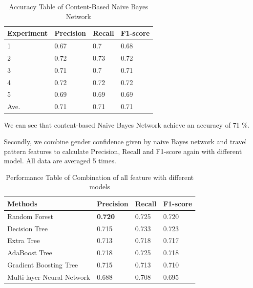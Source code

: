 \documentclass{article}
\begin{document}
\begin{table}[tp]
\centering
\caption{Accuracy Table of Content-Based Naive Bayes Network}
\label{tab1}
\begin{center}
\begin{small}
\begin{sc}
\begin{tabular}{llll}
Experiment & Precision & Recall & F1-score \\ \hline
1          & 0.67      & 0.7    & 0.68     \\
2          & 0.72      & 0.73   & 0.72     \\
3          & 0.71      & 0.7    & 0.71     \\
4          & 0.72      & 0.72   & 0.72     \\
5          & 0.69      & 0.69   & 0.69     \\  \hline
Ave.       & 0.71      & 0.71   & 0.71   
\end{tabular}
\end{sc}
\end{small}
\end{center}
\end{table}

We can see that content-based Naive Bayes Network achieve an accuracy of 71 \%.

Secondly, we combine gender confidence given by naive Bayes network and travel pattern features to calculate Precision, Recall and F1-score again with different model.  All data are averaged 5 times.

\begin{table}[tp]
\centering
\caption{Performance Table of Combination of all feature with different models}
\label{tab2}
\begin{center}
\begin{small}
\begin{sc}
\begin{tabular}{llll}
Methods                    & Precision & Recall & F1-score \\ \hline
Random Forest              & \textbf{0.720}      & 0.725  & 0.720     \\
Decision Tree              & 0.715     & 0.733  & 0.723    \\
Extra Tree                 & 0.713     & 0.718  & 0.717    \\
AdaBoost Tree              & 0.718     & 0.725  & 0.718    \\
Gradient Boosting Tree     & 0.715     & 0.713  & 0.710     \\
Multi-layer Neural Network & 0.688     & 0.708  & 0.695   
\end{tabular}
\end{sc}
\end{small}
\end{center}
\end{table}
\end{document}
